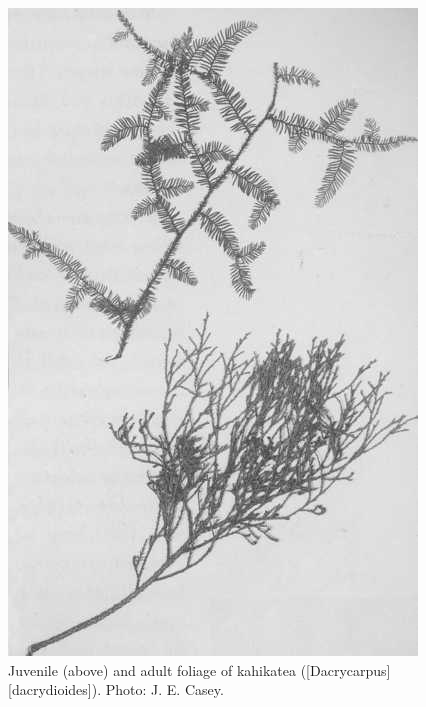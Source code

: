 \begin{figure}[!htb]
\begin{minipage}[t]{0.487\textwidth}
    	\includegraphics[width=\textwidth]{graphics/figure22kahikatea.jpg}
    	\caption[Kahikatea foliage]{Juvenile (above) and adult foliage of kahikatea ([Dacrycarpus][dacrydioides]).
    	Photo: J. E. Casey.}%
    	\label{fig:22kahikatea}
	\end{minipage}
\end{figure}

